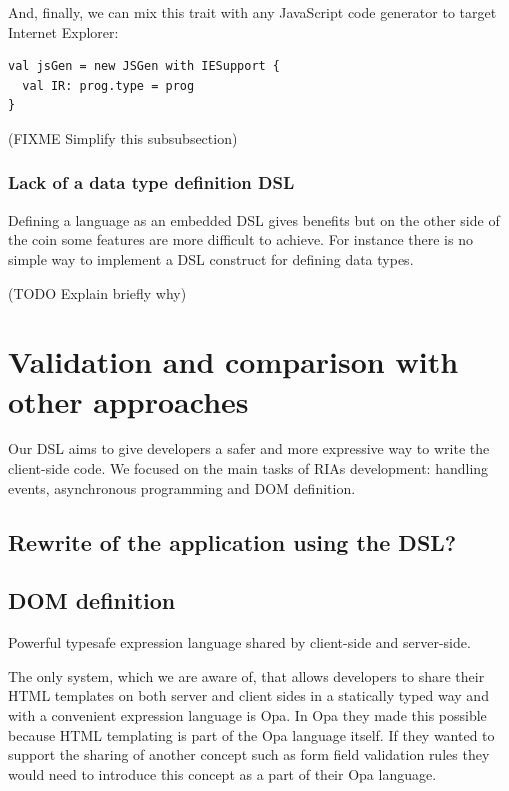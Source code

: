 \documentclass[american,english,runningheads]{llncs}
\begin{document}
And, finally, we can mix this  trait with any JavaScript code generator to target Internet Explorer:

\begin{lstlisting}
val jsGen = new JSGen with IESupport {
  val IR: prog.type = prog
}
\end{lstlisting}

(FIXME Simplify this subsubsection)

\subsubsection{Lack of a data type definition DSL}

Defining a language as an embedded DSL gives benefits but on the other side of the coin some features are more difficult to achieve. For instance there is no simple way to implement a DSL construct for defining data types.

(TODO Explain briefly why)

\section{Validation and comparison with other approaches}
\label{validation}

Our DSL aims to give developers a safer and more expressive way to write the client-side code. We focused on the main tasks of RIAs development: handling events, asynchronous programming and DOM definition.

\subsection{Rewrite of the application using the DSL?}

\subsection{DOM definition}

Powerful typesafe expression language shared by client-side and server-side.

The only system, which we are aware of, that allows developers to share their HTML templates on both server and client sides in a statically typed way and with a convenient expression language is Opa. In Opa they made this possible because HTML templating is part of the Opa language itself. If they wanted to support the sharing of another concept such as form field validation rules they would need to introduce this concept as a part of their Opa language.
\end{document}

